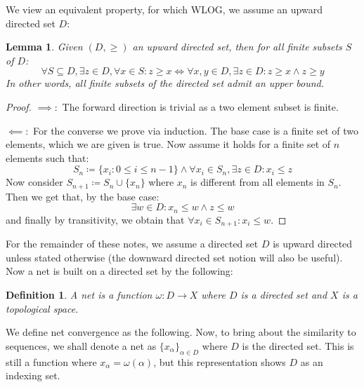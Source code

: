 \documentclass[10pt,letterpaper]{article} %
\newtheorem{lem}{Lemma}[section]
\newtheorem{defn}{Definition}[section]
\begin{document}
We view an equivalent property, for which WLOG, we assume an upward directed set $D$:
\begin{lem}
Given $(D, \geq)$ an upward directed set, then for all finite subsets $S$ of $D$:
\begin{equation*}
\forall S \subseteq D, \exists z \in D, \forall x \in S: z \geq x \iff \forall x, y \in D, \exists z \in D: z \geq x \land z \geq y 
\end{equation*}
In other words, all finite subsets of the directed set admit an upper bound.
\end{lem}
\begin{proof}
$\implies:$ The forward direction is trivial as a two element subset is finite.

$\impliedby:$ For the converse we prove via induction. The base case is a finite set of two elements, which we are given is true. Now assume it holds for a finite set of $n$ elements such that:
\begin{equation*}
S_n \coloneq \{x_i: 0 \leqslant i \leqslant n-1\} \land \forall x_i \in S_n, \exists z \in D: x_i \leq z
\end{equation*}
Now consider $S_{n+1} \coloneq S_n \cup \{x_n\}$ where $x_n$ is different from all elements in $S_n$. Then we get that, by the base case:
\begin{equation*}
\exists w \in D: x_n \leq w \land z \leq w
\end{equation*}
and finally by transitivity, we obtain that $\forall x_i \in S_{n+1}: x_i \leq w$. 
\end{proof} 

For the remainder of these notes, we assume a directed set $D$ is upward directed unless stated otherwise (the downward directed set notion will also be useful). Now a net is built on a directed set by the following:
\begin{defn}
A net is a function $\omega: D \xrightarrow{} X$ where $D$ is a directed set and $X$ is a topological space.  
\end{defn}
We define net convergence as the following. Now, to bring about the similarity to sequences, we shall denote a net as $\{x_\alpha\}_{\alpha \in D}$ where $D$ is the directed set. This is still a function where $x_\alpha = \omega(\alpha)$, but this representation shows $D$ as an indexing set.\\
\end{document}
